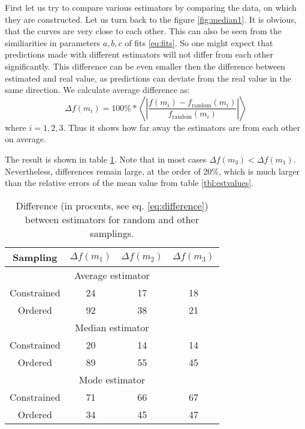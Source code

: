 \documentclass[a4paper,10pt]{article}
\begin{document}
First let us try to compare various estimators by comparing the data, on which they are constructed. Let us turn back to the figure \ref{fig:median1}. It is obvious, that the curves are very close to each other. This can also be seen from the similiarities in parameters $a, b, c$ of fits \ref{eq:fits}. So one might expect that predictions made with different estimators will not differ from each other significantly. This difference can be even smaller then the difference between estimated and real value, as predictions can deviate from the real value in the same direction.
We calculate average difference as:
\begin{equation}
  \Delta f(m_i) = 100\%*\left< \left| \frac{f(m_i) - f_\mathrm{random}(m_i)}{f_\mathrm{random}(m_i)}\right| \right> \label{eq:difference}
\end{equation} 
where $i = 1,2,3$. Thus it shows how far away the estimators are from each other on average.

The result is shown in table \ref{tbl:variance}. Note that in most cases $\Delta f(m_3) < \Delta f(m_1)$. Nevertheless, differences remain large, at the order of 20\%, which is much larger than the relative errors of the mean value from table \ref{tbl:estvalues}.

\begin{table}
\begin{center}
\caption{Difference (in procents, see eq. \ref{eq:difference}) between estimators for random and other samplings.} \label{tbl:variance}
\begin{tabular}{cccc} \\ \toprule
Sampling & $\Delta f(m_1)$ & $\Delta f(m_2)$ & $\Delta f(m_3)$ \\ \midrule
\multicolumn{4}{c}{Average estimator} \\ \midrule
Constrained & 24 & 17 & 18  \\ \midrule
Ordered     & 92 & 38 & 21  \\ \midrule
\multicolumn{4}{c}{Median estimator} \\ \midrule
Constrained & 20 & 14 & 14  \\ \midrule
Ordered     & 89 & 55 & 45  \\ \midrule
\multicolumn{4}{c}{Mode estimator} \\ \midrule
Constrained & 71 & 66 & 67  \\ \midrule
Ordered     & 34 & 45 & 47  \\ \bottomrule
\end{tabular}
\end{center}
\end{table}
\end{document}
